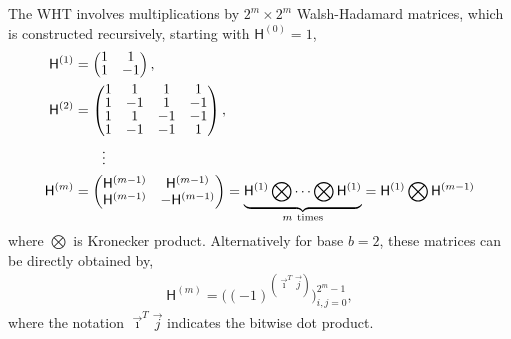 \documentclass{iitthesis}          %
\newcommand{\mH}{\mathsf{H}}
\begin{document}
The WHT involves multiplications by $2^m \times 2^m$ Walsh-Hadamard matrices, which is constructed recursively, starting with $\mH^{(0)} = 1$,
\begin{align}
\nonumber
\arraycolsep=1.4pt\def\arraystretch{0.9}
\mH^{(1)} &=
\begin{pmatrix}
1 & 1 \\ 1 & -1
\end{pmatrix}, \\
\nonumber
\mH^{(2)} &= 
\begin{pmatrix}
1 & 1 & 1 & 1 \\ 
1 & -1 & 1 & -1 \\
1 & 1 & -1 & -1 \\ 
1 & -1 & -1 & 1 \\
\end{pmatrix}, \\
\nonumber
& \qquad \vdots
\\
\label{eqn:hadamard_matrix}
\mH^{(m)} &= 
\begin{pmatrix}
\mH^{(m-1)} & \mH^{(m-1)} \\ \mH^{(m-1)} & -\mH^{(m-1)}
\end{pmatrix} 
= \underbrace{\mH^{(1)} \bigotimes \cdots \bigotimes \mH^{(1)}}_{m \ \text{times}} 
= \mH^{(1)} \bigotimes \mH^{(m-1)}
\end{align}
where $\bigotimes$ is Kronecker product. Alternatively for base $b=2$, these matrices can be  directly obtained by,
\begin{align*}
\mH^{(m)} %
= \bigg((-1)^{(\vec{\imath}^T \vec{j})} \bigg)_{i,j=0}^{2^m-1},
\end{align*}
where the notation $\vec{\imath}^T \vec{j}$ indicates the bitwise dot product. 

\end{document}

